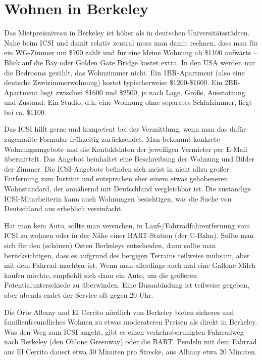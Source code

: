 \documentclass[a4paper]{scrreprt}
\begin{document}
\section{Wohnen in Berkeley}

Das Mietpreisniveau in Berkeley ist höher als in deutschen
Universitätsstädten. Nahe beim ICSI und damit relativ zentral muss man
damit rechnen, dass man für ein WG-Zimmer um \$700 zahlt und für eine
kleine Wohnung ab \$1100 aufwärts -- Blick auf die Bay oder Golden
Gate Bridge kostet extra.
In den USA werden nur die Bedrooms gezählt, das Wohnzimmer nicht.
Ein 1BR-Apartment (also eine deutsche Zweizimmerwohnung) kostet
typischerweise \$1200-\$1600.
Ein 2BR-Apartment liegt zwischen \$1600 und \$2500,
je nach Lage, Größe, Ausstattung und Zustand.
Ein Studio, d.h. eine Wohnung ohne separates Schlafzimmer,
liegt bei ca. \$1100.


Das ICSI hilft gerne und kompetent bei der
Vermittlung, wenn man das dafür zugemailte Formular frühzeitig
zurücksendet. Man bekommt konkrete Wohnungsangebote und die
Kontaktdaten der jeweiligen Vermieter per E-Mail übermittelt. Das
Angebot beinhaltet eine Beschreibung der Wohnung und Bilder der
Zimmer. Die ICSI-Angebote befinden sich meist in nicht allzu großer
Entfernung zum Institut und entsprechen eher einem etwas gehobeneren
Wohnstandard, der annähernd mit Deutschland vergleichbar ist.
Die zuständige ICSI-Mitarbeiterin kann auch Wohnungen besichtigen,
was die Suche von Deutschland aus erheblich vereinfacht.

Hat man kein Auto,
sollte man versuchen, in Lauf-/Fahrradfahrentfernung vom 
ICSI zu wohnen oder in der Nähe einer BART-Station (der
U-Bahn). Sollte man sich für den (schönen) Osten Berkeleys
entscheiden, dann sollte man berücksichtigen, dass es aufgrund des
bergigen Terrains teilweise mühsam, aber mit dem Fahrrad machbar
ist. Wenn man allerdings auch mal eine Gallone Milch kaufen möchte,
empfiehlt sich dann ein Auto, um die größeren Potentialunterschiede zu
überwinden. Eine Busanbindung ist teilweise gegeben, aber abends endet
der Service oft gegen 20 Uhr.

Die Orte Albany und El Cerrito nördlich von Berkeley bieten sicheres
und familienfreundliches Wohnen zu etwas moderateren Preisen als
direkt in Berkeley. Was den Weg zum ICSI angeht, gibt es einen
verkehrsberuhigten Fahrradweg nach Berkeley (den Ohlone Greenway) oder
die BART. Pendeln mit dem Fahrrad aus El Cerrito dauert etwa 30
Minuten pro Strecke, aus Albany etwa 20 Minuten.
\end{document}
